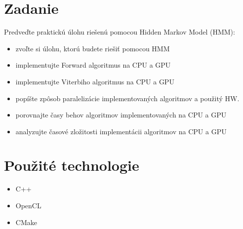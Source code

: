 \documentclass[11pt,a4paper]{article}
\begin{document}
\titlepageandcontents

\section{Zadanie}

Predveďte praktickú úlohu riešenú pomocou Hidden Markov Model (HMM):
\begin{itemize}
\item zvoľte si úlohu, ktorú budete riešiť pomocou HMM
\item implementujte Forward algoritmus na CPU a GPU
\item implementujte Viterbiho algoritmus na CPU a GPU
\item popíšte zpôsob paralelizácie implementovaných algoritmov a použitý HW.
\item porovnajte časy behov algoritmov implementovaných na CPU a GPU
\item analyzujte časové zložitosti implementácii algoritmov na CPU a GPU
\end{itemize}


\section{Použité technologie}
\begin{itemize}
\item C++
\item OpenCL
\item CMake
\end{itemize}


\end{document}
